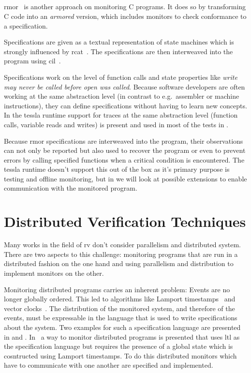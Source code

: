 \subsection{}
\label{sec:related:c_programs:rmor}

\gls{rmor}~\citep{Havelund2008} is another approach on monitoring C programs.
It does so by transforming C code into an \emph{armored} version, which includes monitors to check conformance to a specification.

Specifications are given as a textual representation of state machines which is strongly influenced by \gls{rcat}~\citep{Smith2008}.
The specifications are then interweaved into the program using \gls{cil}~\cite{Necula2002}.

Specifications work on the level of function calls and state properties like \emph{write may never be called before open was called}.
Because software developers are often working at the same abstraction level (in contrast to e.g.\ assembler or machine instructions), they can define specifications without having to learn new concepts.
In the \gls{tessla} runtime support for traces at the same abstraction level (function calls, variable reads and writes) is present and used in most of the tests in .

Because \gls{rmor} specifications are interweaved into the program, their observations can not only be reported but also used to recover the program or even to prevent errors by calling specified functions when a critical condition is encountered.
The \gls{tessla} runtime doesn't support this out of the box as it's primary purpose is testing and offline monitoring, but in  we will look at possible extensions to enable communication with the monitored program.

\section{Distributed Verification Techniques}
\label{sec:related:distributed}

Many works in the field of \gls{rv} don't consider parallelism and distributed system.
There are two aspects to this challenge: monitoring programs that are run in a distributed fashion on the one hand and using parallelism and distribution to implement monitors on the other.

Monitoring distributed programs carries an inherent problem: Events are no longer globally ordered.
This led to algorithms like Lamport timestamps~\citep{Lamport1978} and vector clocks~\citep{Fidge1988}.
The distribution of the monitored system, and therefore of the events, must be expressable in the language that is used to write specifications about the system.
Two examples for such a specification language are presented in \cite{Sen2004} and \cite{Ehrich2000}.
In~\cite{Mostafa2015} a way to monitor distributed programs is presented that uses \gls{ltl} as the specification language but requires the presence of a global state which is cosntructed using Lamport timestamps.
To do this distributed monitors which have to communicate with one another are specified and implemented.


